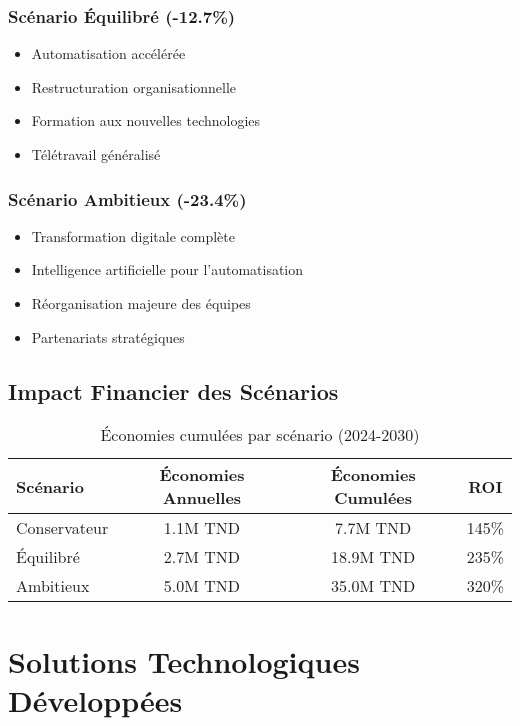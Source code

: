 \documentclass[12pt,a4paper]{article}
\begin{document}
\subsubsection{Scénario Équilibré (-12.7\%)}
\begin{itemize}
    \item Automatisation accélérée
    \item Restructuration organisationnelle
    \item Formation aux nouvelles technologies
    \item Télétravail généralisé
\end{itemize}

\subsubsection{Scénario Ambitieux (-23.4\%)}
\begin{itemize}
    \item Transformation digitale complète
    \item Intelligence artificielle pour l'automatisation
    \item Réorganisation majeure des équipes
    \item Partenariats stratégiques
\end{itemize}

\subsection{Impact Financier des Scénarios}
\begin{table}[H]
\centering
\caption{Économies cumulées par scénario (2024-2030)}
\begin{tabular}{@{}lccc@{}}
\toprule
\textbf{Scénario} & \textbf{Économies Annuelles} & \textbf{Économies Cumulées} & \textbf{ROI} \\
\midrule
Conservateur & 1.1M TND & 7.7M TND & 145\% \\
Équilibré & 2.7M TND & 18.9M TND & 235\% \\
Ambitieux & 5.0M TND & 35.0M TND & 320\% \\
\bottomrule
\end{tabular}
\end{table}

\newpage

\section{Solutions Technologiques Développées}
\end{document}
